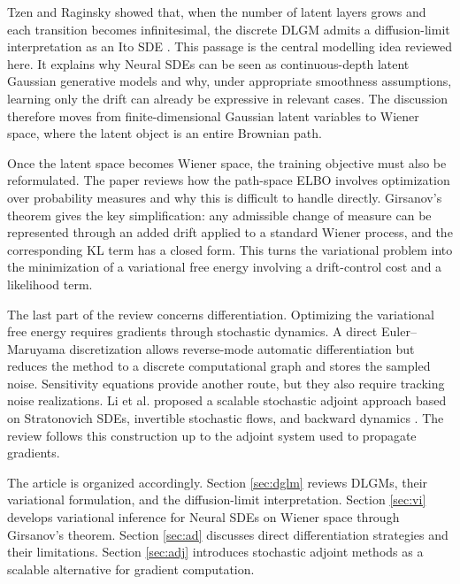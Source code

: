 \documentclass[11pt]{article}
\begin{document}
Tzen and Raginsky showed that, when the number of latent layers grows and each transition becomes infinitesimal, the discrete DLGM admits a diffusion-limit interpretation as an Ito SDE \cite{tzen2019neural}. This passage is the central modelling idea reviewed here. It explains why Neural SDEs can be seen as continuous-depth latent Gaussian generative models and why, under appropriate smoothness assumptions, learning only the drift can already be expressive in relevant cases. The discussion therefore moves from finite-dimensional Gaussian latent variables to Wiener space, where the latent object is an entire Brownian path.

Once the latent space becomes Wiener space, the training objective must also be reformulated. The paper reviews how the path-space ELBO involves optimization over probability measures and why this is difficult to handle directly. Girsanov's theorem gives the key simplification: any admissible change of measure can be represented through an added drift applied to a standard Wiener process, and the corresponding KL term has a closed form. This turns the variational problem into the minimization of a variational free energy involving a drift-control cost and a likelihood term.

The last part of the review concerns differentiation. Optimizing the variational free energy requires gradients through stochastic dynamics. A direct Euler--Maruyama discretization allows reverse-mode automatic differentiation but reduces the method to a discrete computational graph and stores the sampled noise. Sensitivity equations provide another route, but they also require tracking noise realizations. Li et al. proposed a scalable stochastic adjoint approach based on Stratonovich SDEs, invertible stochastic flows, and backward dynamics \cite{li2020scalable}. The review follows this construction up to the adjoint system used to propagate gradients.

The article is organized accordingly. Section \ref{sec:dglm} reviews DLGMs, their variational formulation, and the diffusion-limit interpretation. Section \ref{sec:vi} develops variational inference for Neural SDEs on Wiener space through Girsanov's theorem. Section \ref{sec:ad} discusses direct differentiation strategies and their limitations. Section \ref{sec:adj} introduces stochastic adjoint methods as a scalable alternative for gradient computation.
\end{document}
